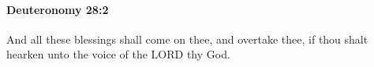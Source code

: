 
		\paragraph{Deuteronomy 28:2} %
			\label{DEUTERONOMY-28-2}

			And all these blessings shall come on thee, and overtake thee, if thou shalt hearken unto the voice of the LORD thy God.


